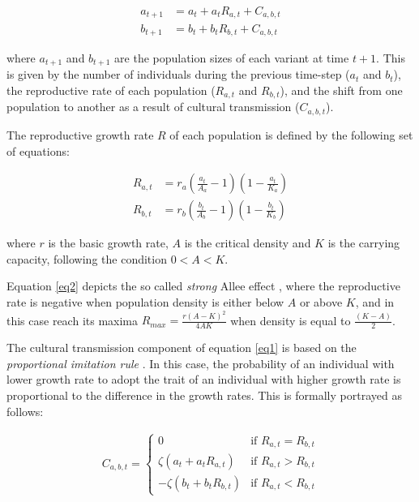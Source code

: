 \documentclass[review,authoryear]{elsarticle}
\begin{document}
\begin{equation}
\begin{aligned}
a_{t+1}& = a_t + a_t R_{a,t} + C_{a,b,t} \\
b_{t+1}& = b_t + b_t R_{b,t} + C_{a,b,t}
\label{eq1}
\end{aligned}
\end{equation}

where $a_{t+1}$ and $b_{t+1}$ are the population sizes of each variant at time $t+1$. This is given by the number of individuals during the previous time-step ($a_t$ and $b_t$), the reproductive rate of each population ($R_{a,t}$ and $R_{b,t}$), and the shift from one population to another as a result of cultural transmission ($C_{a,b,t}$).

The reproductive growth rate $R$ of each population is defined by the following set of equations:

\begin{equation}
\begin{aligned}
R_{a,t}& = r_a (\frac{a_t}{A_a}-1)(1-\frac{a_t}{K_a})\\
R_{b,t}& = r_b (\frac{b_t}{A_b}-1)(1-\frac{b_t}{K_b}) 
\label{eq2}
\end{aligned}
\end{equation}

where $r$ is the basic growth rate, $A$ is the critical density and $K$ is the carrying capacity, following the condition $0<A < K$. 

Equation \eqref{eq2} depicts the so called \emph{strong} Allee effect \citep{Wang_and_Kot_2001}, where the reproductive rate is negative when population density is either below $A$ or above $K$, and  in this case reach its maxima $R_{max}=\frac{r(A-K)^2}{4AK}$ when density is equal to $\frac{(K-A)}{2}$. 

The cultural transmission component of equation \eqref{eq1} is based on the \emph{proportional imitation rule} \citep{schlag1998}. In this case, the probability of an individual with lower growth rate to adopt the trait of an individual with higher growth rate is proportional to the difference in the growth rates. This is formally portrayed as follows:

\begin{equation}
\begin{aligned}
\label{eq3}
C_{a,b,t} = 
\begin{cases}
0& \text{if } R_{a,t} = R_{b,t}\\
\zeta(a_t+a_tR_{a,t})& \text{if } R_{a,t} > R_{b,t}\\
-\zeta(b_t+b_tR_{b,t})& \text{if } R_{a,t} < R_{b,t}
\end{cases}
\end{aligned}
\end{equation}
\end{document}

